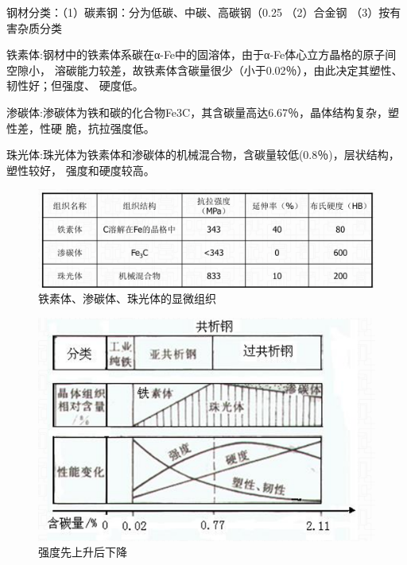 \documentclass[12pt, a4paper, oneside, UTF8]{ctexbook}
\begin{document}
\begin{theorem}
钢材分类：（1）碳素钢：分为低碳、中碳、高碳钢（0.25%
（2）合金钢 （3）按有害杂质分类
\end{theorem}
铁素体:钢材中的铁素体系碳在α-Fe中的固溶体，由于α-Fe体心立方晶格的原子间空隙小，
溶碳能力较差，故铁素体含碳量很少（小于0.02％），由此决定其塑性、韧性好；但强度、
硬度低。

渗碳体:渗碳体为铁和碳的化合物Fe3C，其含碳量高达6.67％，晶体结构复杂，塑性差，性硬
脆，抗拉强度低。

珠光体:珠光体为铁素体和渗碳体的机械混合物，含碳量较低(0.8％)，层状结构，塑性较好，
强度和硬度较高。

\begin{figure}[H]
	\centering
	\includegraphics[width=0.7\linewidth]{../figure/santi.png} %
	\caption{铁素体、渗碳体、珠光体的显微组织}
\end{figure}

\begin{figure}[H]
	\centering
	\includegraphics[width=0.7\linewidth]{../figure/qiangdubianhua.png} %
	\caption{强度先上升后下降}
\end{figure}
\end{document}
